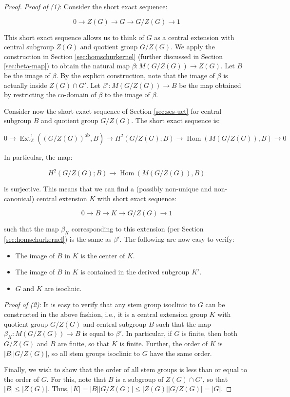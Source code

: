 \documentclass{ucetd}
\begin{document}
\begin{proof}
  {\em Proof of (1)}: Consider the short exact sequence:

  $$0 \to Z(G) \to G \to G/Z(G) \to 1$$

  This short exact sequence allows us to think of $G$ as a central
  extension with central subgroup $Z(G)$ and quotient group
  $G/Z(G)$. We apply the construction in Section
  \ref{sec:homschurkernel} (further discussed in Section
  \ref{sec:beta-map}) to obtain the natural map $\beta:M(G/Z(G)) \to
  Z(G)$. Let $B$ be the image of $\beta$. By the explicit
  construction, note that the image of $\beta$ is actually inside
  $Z(G) \cap G'$. Let $\beta':M(G/Z(G)) \to B$ be the map obtained by
  restricting the co-domain of $\beta$ to the image of $\beta$.

  Consider now the short exact sequence of Section \ref{sec:ses-uct}
  for central subgroup $B$ and quotient group $G/Z(G)$. The short exact sequence is:

  $$0 \to \operatorname{Ext}^1_{\mathbb{Z}}((G/Z(G))^{\operatorname{ab}},B) \to H^2(G/Z(G);B) \to \operatorname{Hom}(M(G/Z(G)),B) \to 0$$

  In particular, the map:

  $$H^2(G/Z(G);B) \to \operatorname{Hom}(M(G/Z(G)),B)$$

  is surjective. This means that we can find a (possibly non-unique
  and non-canonical) central extension $K$ with short exact sequence:

  $$0 \to B \to K \to G/Z(G) \to 1$$

  such that the map $\beta_K$ corresponding to this extension (per
  Section \ref{sec:homschurkernel}) is the same as $\beta'$. The following
  are now easy to verify: %

  \begin{itemize}
  \item The image of $B$ in $K$ is the center of $K$.
  \item The image of $B$ in $K$ is contained in the derived subgroup $K'$.
  \item $G$ and $K$ are isoclinic.
  \end{itemize}

  {\em Proof of (2)}: It is easy to verify that any stem group
  isoclinic to $G$ can be constructed in the above fashion, i.e., it
  is a central extension group $K$ with quotient group $G/Z(G)$ and
  central subgroup $B$ such that the map $\beta_K: M(G/Z(G)) \to B$ is
  equal to $\beta'$. In particular, if $G$ is finite, then both
  $G/Z(G)$ and $B$ are finite, so that $K$ is finite. Further, the
  order of $K$ is $|B||G/Z(G)|$, so all stem groups isoclinic to $G$
  have the same order.

  Finally, we wish to show that the order of all stem groups is less
  than or equal to the order of $G$. For this, note that $B$ is a
  subgroup of $Z(G) \cap G'$, so that $|B| \le |Z(G)|$. Thus, $|K| =
  |B||G/Z(G)| \le |Z(G)||G/Z(G)| = |G|$.
\end{proof}
  
\end{document}
